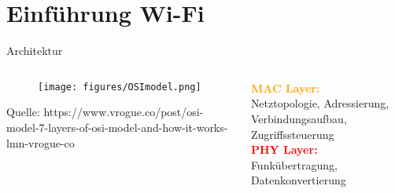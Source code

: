 %
%
{
\section{Einführung Wi-Fi}

\begin{frame}
    \centering
    \tableofcontents[currentsection]
\end{frame}

\begin{frame}{Architektur}
    \begin{columns}
        \begin{column}{0.4\textwidth}
            \begin{figure}
                \centering
                \texttt{[image: figures/OSImodel.png]}
            \end{figure}
                \fontsize{4}{4}\selectfont Quelle: https://www.vrogue.co/post/osi-model-7-layers-of-osi-model-and-how-it-works-lmn-vrogue-co
        \end{column}

        \begin{column}{0.6\textwidth}
            \small
            \textcolor{orange}{\textbf{MAC Layer:}}
            \\Netztopologie, Adressierung, Verbindungsaufbau, Zugriffssteuerung
            \vspace{1.5cm}
            \\\textcolor{red}{\textbf{PHY Layer:}}
            \\Funkübertragung, Datenkonvertierung
        \end{column}
    \end{columns}
\end{frame}


}
